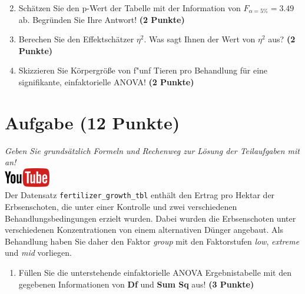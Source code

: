 \documentclass[a4paper, 9pt]{scrartcl}\usepackage[]{graphicx}\usepackage[]{xcolor}
\begin{document}
\vspace{1Ex}

\begin{enumerate}
  \setcounter{enumi}{1}
\item Sch{\"a}tzen Sie den p-Wert der Tabelle mit der Information von
  $F_{\alpha = 5\%} = 3.49$ ab. Begr{\"u}nden Sie Ihre
  Antwort! \textbf{(2 Punkte)}
\item Berechen Sie den Effektsch{\"a}tzer $\eta^2$. Was sagt Ihnen der Wert von
  $\eta^2$ aus? \textbf{(2 Punkte)}
\item Skizzieren Sie K{\"o}rpergr{\"o}{\ss}e von f{"u}nf Tieren pro Behandlung f{\"u}r eine
  signifikante, einfaktorielle ANOVA! \textbf{(2 Punkte)}
\end{enumerate}



 
\clearpage

\section{Aufgabe \hfill (12 Punkte)}

\textit{Geben Sie grunds{\"a}tzlich Formeln und Rechenweg zur L{\"o}sung der
  Teilaufgaben mit an!} \\[1Ex]

\hfill\href{https://youtu.be/49hvImMwVyE}{\includegraphics[width =
  2cm]{img/youtube}}\\[1Ex]




Der Datensatz \texttt{fertilizer\_growth\_tbl} enth{\"a}lt den Ertrag pro Hektar der
Erbsenschoten, die unter einer Kontrolle und zwei
verschiedenen Behandlungsbedingungen erzielt wurden. Dabei wurden die
Erbsenschoten unter verschiedenen Konzentrationen von einem alternativen
D{\"u}nger angebaut. Als Behandlung haben Sie daher den Faktor \textit{group} mit den
Faktorstufen \textit{low}, \textit{extreme} und
\textit{mid} vorliegen.



\begin{enumerate}
\item F{\"u}llen Sie die unterstehende einfaktorielle ANOVA Ergebnistabelle
  mit den gegebenen Informationen von \textbf{Df} und \textbf{Sum Sq} aus!
  \textbf{(3 Punkte)}
\end{enumerate}
\end{document}
